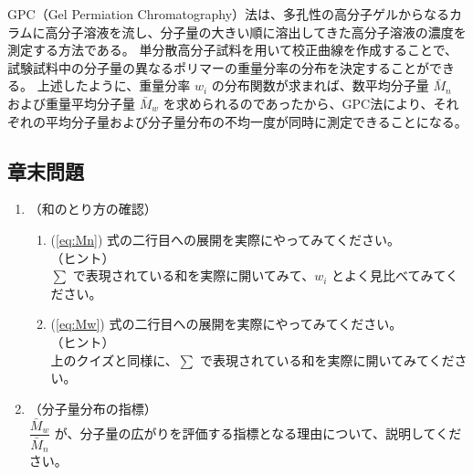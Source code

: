 \documentclass[a4paper,11pt]{ltjsarticle}
\begin{document}
GPC（Gel Permiation Chromatography）法は、多孔性の高分子ゲルからなるカラムに高分子溶液を流し、分子量の大きい順に溶出してきた高分子溶液の濃度を測定する方法である。
単分散高分子試料を用いて校正曲線を作成することで、試験試料中の分子量の異なるポリマーの重量分率の分布を決定することができる。
上述したように、重量分率 $w_i$ の分布関数が求まれば、数平均分子量 $\bar{M}_n$ および重量平均分子量 $\bar{M}_w$ を求められるのであったから、GPC法により、それぞれの平均分子量および分子量分布の不均一度が同時に測定できることになる。



\subsection{章末問題}

	\begin{enumerate}
	\item
	（和のとり方の確認）\\
		\vspace{-5mm}
		\begin{enumerate}
		\item
		\label{it:4-1}
		(\ref{eq:Mn}) 式の二行目への展開を実際にやってみてください。\\
		（ヒント）\\
		$\sum$ で表現されている和を実際に開いてみて、$w_i$ とよく見比べてみてください。

		\item
		\label{it:4-2}
		(\ref{eq:Mw}) 式の二行目への展開を実際にやってみてください。\\
		（ヒント）\\
		上のクイズと同様に、$\sum$ で表現されている和を実際に開いてみてください。
		\end{enumerate}
	\item
	（分子量分布の指標）\\
	\label{it:4-3}
	$\dfrac{\bar{M}_w}{\bar{M}_n}$ が、分子量の広がりを評価する指標となる理由について、説明してください。

	\end{enumerate}
\end{document}
